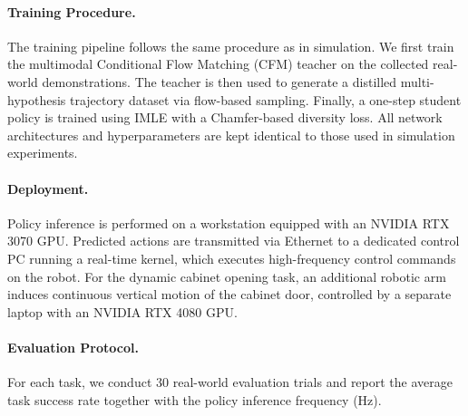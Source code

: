 \paragraph{Training Procedure.}
The training pipeline follows the same procedure as in simulation.
We first train the multimodal Conditional Flow Matching (CFM) teacher on the collected real-world demonstrations.
The teacher is then used to generate a distilled multi-hypothesis trajectory dataset via flow-based sampling.
Finally, a one-step student policy is trained using IMLE with a Chamfer-based diversity loss.
All network architectures and hyperparameters are kept identical to those used in simulation experiments.

\paragraph{Deployment.}
Policy inference is performed on a workstation equipped with an NVIDIA RTX 3070 GPU.
Predicted actions are transmitted via Ethernet to a dedicated control PC running a real-time kernel, which executes high-frequency control commands on the robot.
For the dynamic cabinet opening task, an additional robotic arm induces continuous vertical motion of the cabinet door, controlled by a separate laptop with an NVIDIA RTX 4080 GPU.

\paragraph{Evaluation Protocol.}
For each task, we conduct 30 real-world evaluation trials and report the average task success rate together with the policy inference frequency (Hz).




